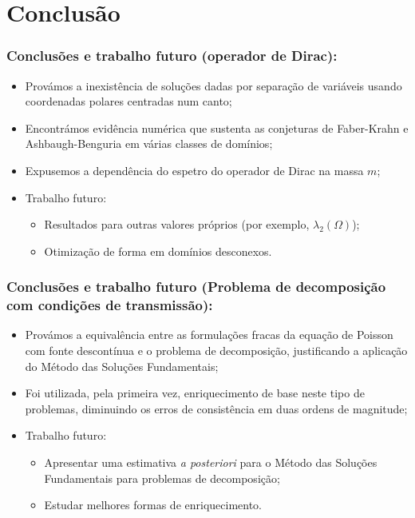 \documentclass[portuguese,notheorems]{beamer}
\begin{document}
\section{Conclusão}

\begin{frame}
\frametitle{Conclusões e trabalho futuro (operador de Dirac):}
            \begin{itemize}
                \pause
                \item Provámos a  inexistência de soluções dadas por separação de variáveis usando coordenadas polares centradas num canto;
                \pause
                \item Encontrámos evidência numérica que sustenta as conjeturas de Faber-Krahn e Ashbaugh-Benguria em várias classes de domínios;
                \pause
                \item Expusemos a dependência do espetro do operador de Dirac na massa $m$;
                \pause
                \item Trabalho futuro:
                    \begin{itemize}
                        \item Resultados para outras valores próprios (por exemplo, $\lambda_2(\Omega)$);
                        \item Otimização de forma em domínios desconexos.
                    \end{itemize}
    \end{itemize}
\end{frame}
\begin{frame}
\frametitle{Conclusões e trabalho futuro (Problema de decomposição com condições de transmissão):}
    \begin{itemize}
            \pause
                \item Provámos a equivalência entre as formulações fracas da equação de Poisson com fonte descontínua e o problema de decomposição, justificando a aplicação do Método das Soluções Fundamentais;
                \pause
                \item Foi utilizada, pela primeira vez, enriquecimento de base neste tipo de problemas, diminuindo os erros de consistência em duas ordens de magnitude;
                \pause
                \item Trabalho futuro:
                    \begin{itemize}
                        \item Apresentar uma estimativa \textit{a posteriori} para o Método das Soluções Fundamentais para problemas de decomposição;
                        \item Estudar melhores formas de enriquecimento.
                    \end{itemize}
            \end{itemize}
\end{frame}
\end{document}
